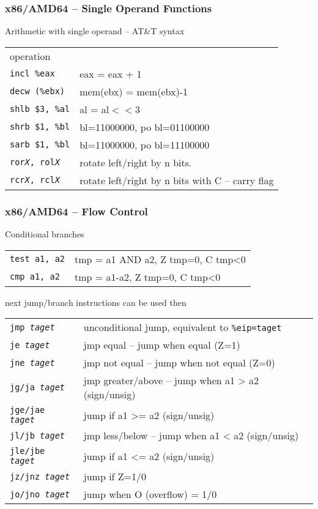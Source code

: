 \documentclass{beamer}
\begin{document}
\begin{frame}
\frametitle{x86/AMD64 -- Single Operand Functions}
Arithmetic with single operand -- AT\&T syntax
\begin{tabular}{ l l}
operation &\\
\texttt{incl            \%eax} &              eax = eax + 1\\
\texttt{decw            (\%ebx)} &                 mem(ebx) = mem(ebx)-1\\
\texttt{shlb            \$3, \%al} &                al = al$<<$3\\
\texttt{shrb            \$1, \%bl} &                bl=11000000, po bl=01100000\\
\texttt{sarb            \$1, \%bl} &                bl=11000000, po bl=11100000\\
\texttt{ror\textit{X}, rol\textit{X}} & rotate left/right by n bits.  \\
\texttt{rcr\textit{X}, rcl\textit{X}} & rotate left/right by n bits with C -- carry flag\\
\end{tabular}
\end{frame}


\begin{frame}
\frametitle{x86/AMD64 -- Flow Control}
Conditional branches\\
\begin{tabular}{ l l}
\texttt{test    a1, a2} &  tmp = a1 AND a2, Z tmp=0, C tmp<0\\
\texttt{cmp     a1, a2} &  tmp = a1-a2, Z tmp=0, C tmp<0\\
\end{tabular}

next jump/branch instructions can be used then
\begin{tabular}{ l l}
\texttt{jmp \textit{taget}} & unconditional jump, equivalent to \texttt{\%eip=taget}\\
\texttt{je  \textit{taget}} & jmp equal -- jump when equal (Z=1)\\
\texttt{jne \textit{taget}} & jmp not equal -- jump when not equal (Z=0)\\
\texttt{jg/ja \textit{taget}} & jmp greater/above – jump when a1 > a2 (sign/unsig)\\
\texttt{jge/jae \textit{taget}} & jump if a1 >= a2 (sign/unsig)\\
\texttt{jl/jb \textit{taget}} & jmp less/below – jump when a1 < a2 (sign/unsig)\\
\texttt{jle/jbe \textit{taget}} & jump if a1 <= a2 (sign/unsig)\\
\texttt{jz/jnz \textit{taget}} & jump if Z=1/0\\
\texttt{jo/jno \textit{taget}}& jump when O (overflow) = 1/0\\
\end{tabular}
\end{frame}
\end{document}
